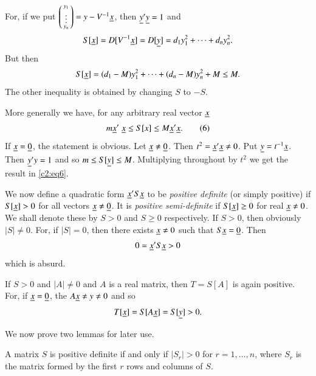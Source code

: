 For, if we put $\left(\begin{smallmatrix} y_{1}\\ \vdots\\ y_{n}
\end{smallmatrix}\right)=y-V^{-1}\underline{x}$, then $\underline{y}'\underline{y}=1$ and
$$
S[\underline{x}]=D[V^{-1}\underline{x}]=D[\underline{y}]=d_{1}y^{2}_{1}+\cdots+d_{n}y^{2}_{n}.
$$
But then
$$
S[\underline{x}]=(d_{1}-M)y^{2}_{1}+\cdots+(d_{n}-M)y^{2}_{n}+M \leq M.
$$
The other inequality is obtained by changing $S$ to $-S$.

More generally we have, for any arbitrary real vector $\underline{x}$
\begin{equation*}
m\underline{x}'\;\underline{x}\leq S[x]\leq M\underline{x}'\underline{x}.\tag{6}\label{c2:eq6}
\end{equation*}
If $\underline{x}=\underline{0}$, the statement is obvious. Let $\underline{x}\neq
\underline{0}$. Then $t^{2}=\underline{x}'\underline{x}\neq 0$. Put
$\underline{y}=t^{-1}\underline{x}$. Then $\underline{y}'y=1$ and so $m\leq S[\underline{y}]\leq
M$. Multiplying throughout by $t^{2}$ we get the result in \eqref{c2:eq6}.

We now define a quadratic form $\underline{x}'S\underline{x}$ to be {\em positive
  definite} (or simply positive) if $S[\underline{x}]>0$ for all vectors
$\underline{x}\neq \underline{0}$. It is {\em positive semi-definite} if
$S[\underline{x}]\geq 0$ for real $\underline{x}\neq 0$. We shall denote these by
$S>0$ and $S\geq 0$ respectively. If $S>0$, then\pageoriginale
obviously $|S|\neq 0$. For, if $|S|=0$, then there exists $\underline{x}\neq
0$ such that $S\underline{x}=\underline{0}$. Then
$$
0=\underline{x}'S\underline{x}>0
$$
which is absurd.

If $S>0$ and $|A|\neq 0$ and $A$ is a real matrix, then $T=S[A]$ is
again positive. For, if $\underline{x}=\underline{0}$, the $A\underline{x}\neq y\neq 0$ and
so
$$
T[\underline{x}]=S[A\underline{x}]=S[\underline{y}]>0.
$$

We now prove two lemmas for later use.

\begin{lem}\label{chap2:lem1}
A matrix $S$ is positive definite if and only if $|S_{r}|>0$ for
$r=1,\ldots,n$, where $S_{r}$ is the matrix formed by the first $r$
rows and columns of $S$.
\end{lem}

